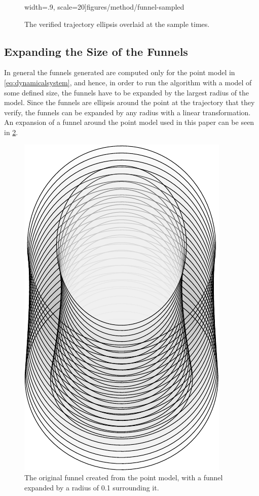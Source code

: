 \begin{figure}[!t]
\begin{minipage}[r]{.45\columnwidth}
    width=.9\columnwidth,
    scale=20]{figures/method/funnel-sampled}
    \caption{The verified trajectory ellipsis overlaid at the sample times.}
    \label{fig:funnel-straight-sampled}
  \end{minipage}
\end{figure}


\subsection{Expanding the Size of the Funnels}

In general the funnels generated are computed only for the point model in
\cref{eq:dynamicalsystem}, and hence, in order to run the algorithm with a
model of some defined size, the funnels have to be expanded by the largest
radius of the model. Since the funnels are ellipsis around the point at the
trajectory that they verify, the funnels can be expanded by any radius with a
linear transformation. An expansion of a funnel around the point model used in
this paper can be seen in \cref{fig:expanded-funnel}.


\begin{figure}[!t]
  \centering \includegraphics[scale=.3]{figures/method/expanded-funnel}
  \caption[The expanded experiment funnel]{The original funnel created from the point model, with a funnel
    expanded by a radius of 0.1 surrounding it.}
  \label{fig:expanded-funnel}
\end{figure}
